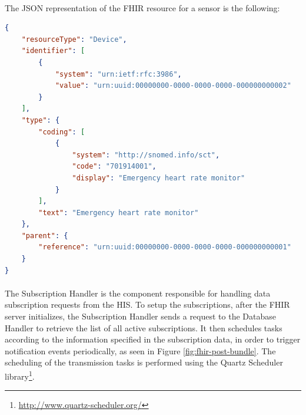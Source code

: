 \paragraph{} The \acs{JSON} representation of the \acs{FHIR} resource for a sensor is the following:
\begin{lstlisting}[language=json]            
{
    "resourceType": "Device",
    "identifier": [
        {
            "system": "urn:ietf:rfc:3986",
            "value": "urn:uuid:00000000-0000-0000-0000-000000000002"
        }
    ],
    "type": {
        "coding": [
            {
                "system": "http://snomed.info/sct",
                "code": "701914001",
                "display": "Emergency heart rate monitor"
            }
        ],
        "text": "Emergency heart rate monitor"
    },
    "parent": {
        "reference": "urn:uuid:00000000-0000-0000-0000-000000000001"
    }
}
\end{lstlisting} 
% 

\paragraph{} The Subscription Handler is the component responsible for handling data subscription requests from the \acs{HIS}. To setup the subscriptions, after the \acs{FHIR} server initializes, the Subscription Handler sends a request to the Database Handler to retrieve the list of all active subscriptions. It then schedules tasks according to the information specified in the subscription data, in order to trigger notification events periodically, as seen in Figure \ref{fig:fhir-post-bundle}. The scheduling of the transmission tasks is performed using the Quartz Scheduler library\footnote{\url{http://www.quartz-scheduler.org/}}.


